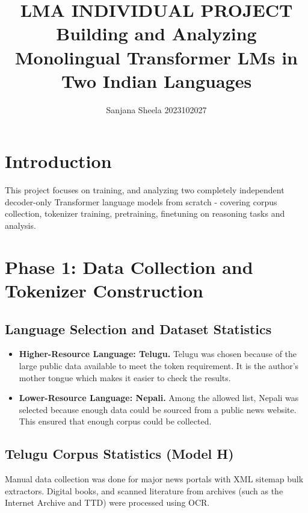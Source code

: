 \documentclass[8pt]{article}
\title{\textbf{LMA INDIVIDUAL PROJECT} \\ \large Building and Analyzing Monolingual Transformer LMs in Two Indian Languages}
\author{Sanjana Sheela 2023102027}
\date{}
\begin{document}
\maketitle
\section{Introduction}
\label{sec:introduction}

This project focuses on training, and analyzing two completely independent decoder-only Transformer language models from scratch - covering corpus collection, tokenizer training, pretraining, finetuning on reasoning tasks and analysis.

\section{Phase 1: Data Collection and Tokenizer Construction}
\label{sec:phase1}

\subsection{Language Selection and Dataset Statistics}
\begin{itemize}
    \item \textbf{Higher-Resource Language: Telugu.} Telugu was chosen because of the large public data available to meet the token requirement. It is the author's mother tongue which makes it easier to check the results.
    \item \textbf{Lower-Resource Language: Nepali.} Among the allowed list, Nepali was selected because enough data could be sourced from a public news website. This ensured that enough corpus could be collected.
\end{itemize}



\subsection{Telugu Corpus Statistics (Model H)}
Manual data collection was done for major news portals with XML sitemap bulk extractors. Digital books, and scanned literature from archives (such as the Internet Archive and TTD) were processed using OCR.
\end{document}
